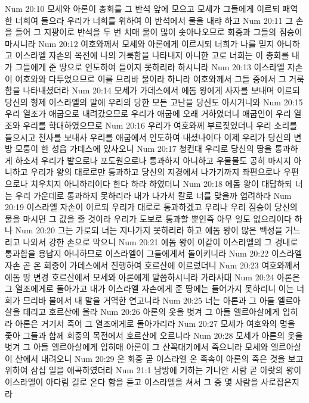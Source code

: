 Num 20:10  모세와 아론이 총회를 그 반석 앞에 모으고 모세가 그들에게 이르되 패역한 너희여 들으라 우리가 너희를 위하여 이 반석에서 물을 내랴 하고
Num 20:11  그 손을 들어 그 지팡이로 반석을 두 번 치매 물이 많이 솟아나오므로 회중과 그들의 짐승이 마시니라
Num 20:12  여호와께서 모세와 아론에게 이르시되 너희가 나를 믿지 아니하고 이스라엘 자손의 목전에 나의 거룩함을 나타내지 아니한 고로 너희는 이 총회를 내가 그들에게 준 땅으로 인도하여 들이지 못하리라 하시니라
Num 20:13  이스라엘 자손이 여호와와 다투었으므로 이를 므리바 물이라 하니라 여호와께서 그들 중에서 그 거룩함을 나타내셨더라
Num 20:14  모세가 가데스에서 에돔 왕에게 사자를 보내며 이르되 당신의 형제 이스라엘의 말에 우리의 당한 모든 고난을 당신도 아시거니와
Num 20:15  우리 열조가 애굽으로 내려갔으므로 우리가 애굽에 오래 거하였더니 애굽인이 우리 열조와 우리를 학대하였으므로
Num 20:16  우리가 여호와께 부르짖었더니 우리 소리를 들으시고 천사를 보내사 우리를 애굽에서 인도하여 내셨나이다 이제 우리가 당신의 변방 모퉁이 한 성읍 가데스에 있사오니
Num 20:17  청컨대 우리로 당신의 땅을 통과하게 하소서 우리가 밭으로나 포도원으로나 통과하지 아니하고 우물물도 공히 마시지 아니하고 우리가 왕의 대로로만 통과하고 당신의 지경에서 나가기까지 좌편으로나 우편으로나 치우치지 아니하리이다 한다 하라 하였더니
Num 20:18  에돔 왕이 대답하되 너는 우리 가운데로 통과하지 못하리라 내가 나가서 칼로 너를 맞을까 염려하라
Num 20:19  이스라엘 자손이 이르되 우리가 대로로 통과하겠고 우리나 우리 짐승이 당신의 물을 마시면 그 값을 줄 것이라 우리가 도보로 통과할 뿐인즉 아무 일도 없으리이다 하나
Num 20:20  그는 가로되 너는 지나가지 못하리라 하고 에돔 왕이 많은 백성을 거느리고 나와서 강한 손으로 막으니
Num 20:21  에돔 왕이 이같이 이스라엘의 그 경내로 통과함을 용납지 아니하므로 이스라엘이 그들에게서 돌이키니라
Num 20:22  이스라엘 자손 곧 온 회중이 가데스에서 진행하여 호르산에 이르렀더니
Num 20:23  여호와께서 에돔 땅 변경 호르산에서 모세와 아론에게 말씀하시니라 가라사대
Num 20:24  아론은 그 열조에게로 돌아가고 내가 이스라엘 자손에게 준 땅에는 들어가지 못하리니 이는 너희가 므리바 물에서 내 말을 거역한 연고니라
Num 20:25  너는 아론과 그 아들 엘르아살을 데리고 호르산에 올라
Num 20:26  아론의 옷을 벗겨 그 아들 엘르아살에게 입히라 아론은 거기서 죽어 그 열조에게로 돌아가리라
Num 20:27  모세가 여호와의 명을 좇아 그들과 함께 회중의 목전에서 호르산에 오르니라
Num 20:28  모세가 아론의 옷을 벗겨 그 아들 엘르아살에게 입히매 아론이 그 산꼭대기에서 죽으니라 모세와 엘르아살이 산에서 내려오니
Num 20:29  온 회중 곧 이스라엘 온 족속이 아론의 죽은 것을 보고 위하여 삼십 일을 애곡하였더라
Num 21:1  남방에 거하는 가나안 사람 곧 아랏의 왕이 이스라엘이 아다림 길로 온다 함을 듣고 이스라엘을 쳐서 그 중 몇 사람을 사로잡은지라
